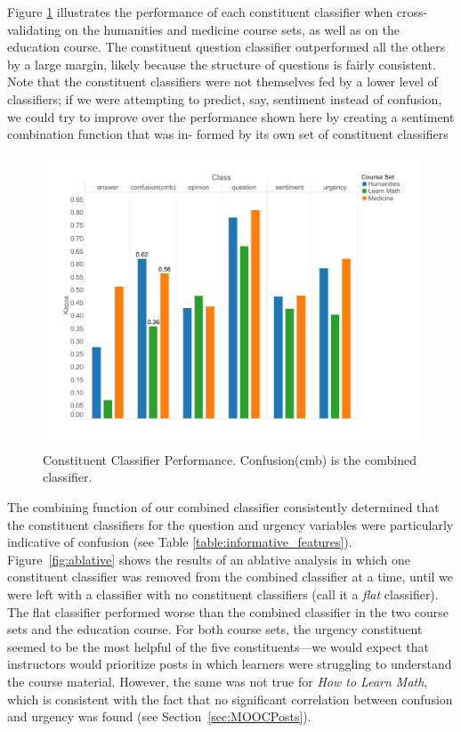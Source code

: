 \documentclass{edm_template}
\begin{document}
Figure \ref{figure:constituents} illustrates the performance of each constituent classifier when cross-validating on the humanities and medicine course sets, as well as on the education course. The constituent question classifier outperformed all the others by a large margin, likely because the structure of questions is fairly consistent. Note that the constituent classifiers were not themselves fed by a lower level of classifiers; if we were attempting to predict, say, sentiment instead of confusion, we could try to improve over the performance shown here by creating a sentiment combination function that was in- formed by its own set of constituent classifiers

\begin{figure}[]
       \centering
       \includegraphics[width=1.0\textwidth]{../Figs/classifierEvalsWithEdu.pdf}
       \caption{\textnormal{Constituent Classifier Performance. Confusion(cmb) is the combined classifier.}}
      \label{figure:constituents}
\end{figure}

The combining function of our combined classifier consistently determined that the constituent classifiers for the question and urgency variables were particularly indicative of confusion (see Table \ref{table:informative_features}). Figure~\ref{fig:ablative} shows the results of an ablative analysis in which one constituent classifier was removed from the combined classifier at a time, until we were left with a classifier with no constituent classifiers (call it a \emph{flat} classifier). The flat classifier performed worse than the combined classifier in the two course sets and the education course. For both course sets, the urgency constituent seemed to be the most helpful of the five constituents---we would expect that instructors would prioritize posts in which learners were struggling to understand the course material. However, the same was not true for \emph{How to Learn Math}, which is consistent with the fact that no significant correlation between confusion and urgency was found (see Section~\ref{sec:MOOCPosts}).
\end{document}
